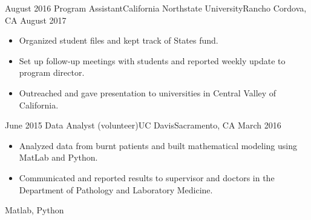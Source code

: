 %
%
%
\begin{experiences}
  \experience
    {August 2016}   {Program Assistant}{California Northstate University}{Rancho Cordova, CA}
    {August 2017} {
                      \begin{itemize}
                       \item Organized student files and kept track of States fund.
                       \item Set up follow-up meetings with students and reported weekly update to program director.
                        \item Outreached and gave presentation to universities in Central Valley of California.                        
                      \end{itemize}
                    }
                    {}
  \emptySeparator
  \experience
    {June 2015} {Data Analyst (volunteer)}{UC Davis}{Sacramento, CA}
    {March 2016}    {
                    \begin{itemize}
                       \item Analyzed data from burnt patients and built mathematical modeling using MatLab and Python.
                       \item Communicated and reported results to supervisor and doctors in the Department of Pathology and Laboratory
Medicine.                      
                      \end{itemize}
                    }
                    {Matlab, Python}
  \emptySeparator
 

\end{experiences}
